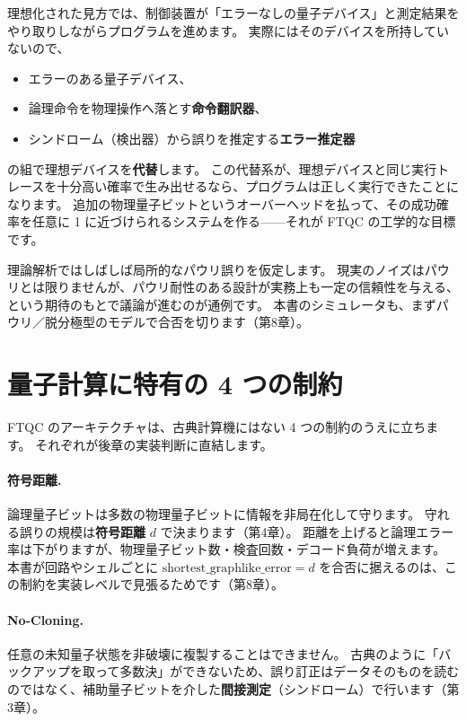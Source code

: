 理想化された見方では、制御装置が「エラーなしの量子デバイス」と測定結果をやり取りしながらプログラムを進めます。
実際にはそのデバイスを所持していないので、
\begin{itemize}
  \item エラーのある量子デバイス、
  \item 論理命令を物理操作へ落とす\textbf{命令翻訳器}、
  \item シンドローム（検出器）から誤りを推定する\textbf{エラー推定器}
\end{itemize}
の組で理想デバイスを\textbf{代替}します。
この代替系が、理想デバイスと同じ実行トレースを十分高い確率で生み出せるなら、プログラムは正しく実行できたことになります。
追加の物理量子ビットというオーバーヘッドを払って、その成功確率を任意に 1 に近づけられるシステムを作る——それが FTQC の工学的な目標です。

\begin{notebox}
  理論解析ではしばしば局所的なパウリ誤りを仮定します。
  現実のノイズはパウリとは限りませんが、パウリ耐性のある設計が実務上も一定の信頼性を与える、という期待のもとで議論が進むのが通例です。
  本書のシミュレータも、まずパウリ／脱分極型のモデルで合否を切ります（第8章）。
\end{notebox}

\section{量子計算に特有の 4 つの制約}\label{sec:four_constraints}

FTQC のアーキテクチャは、古典計算機にはない 4 つの制約のうえに立ちます。
それぞれが後章の実装判断に直結します。

\paragraph{符号距離.}
論理量子ビットは多数の物理量子ビットに情報を非局在化して守ります。
守れる誤りの規模は\textbf{符号距離} $d$ で決まります\cite{fowler2012surface}（第4章）。
距離を上げると論理エラー率は下がりますが、物理量子ビット数・検査回数・デコード負荷が増えます。
本書が回路やシェルごとに $\mathrm{shortest\_graphlike\_error}=d$ を合否に据えるのは、この制約を実装レベルで見張るためです（第8章）。

\paragraph{No-Cloning.}
任意の未知量子状態を非破壊に複製することはできません。
古典のように「バックアップを取って多数決」ができないため、誤り訂正はデータそのものを読むのではなく、補助量子ビットを介した\textbf{間接測定}（シンドローム）で行います（第3章）。

